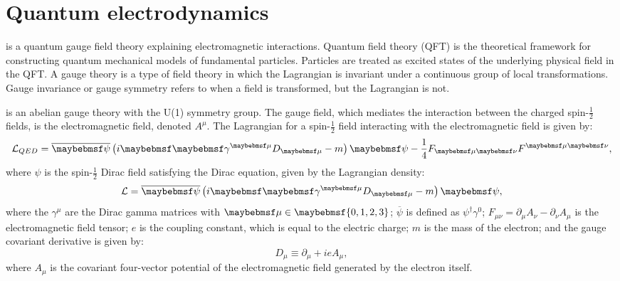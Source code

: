 \section{Quantum electrodynamics}


 \QED is a  quantum gauge field theory explaining electromagnetic interactions. Quantum field theory (QFT) is the theoretical framework for constructing quantum mechanical models of fundamental particles. Particles are treated as excited states of the underlying physical field in the QFT.  A gauge theory is a type of field theory in which the Lagrangian is invariant under a continuous group of local transformations.  Gauge invariance or gauge symmetry refers to when a field is transformed, but the Lagrangian is not.

\QED is an abelian gauge theory with the  U(1) symmetry group. The gauge field, which mediates the interaction between the charged spin-$\frac{1}{2}$ fields, is the electromagnetic field, denoted $A^{\mu}$. The \QED Lagrangian \cite{peskin1995introduction} for a spin-$\frac{1}{2}$ field interacting with the electromagnetic field is given by:
\begin{equation}
\Lagr_{QED} = \overline{\psi} \left( i\Dstroke - m \right)\psi -  \frac{1}{4}F_{\mu\nu}F^{\mu\nu},
\end{equation}
where $\psi$ is the spin-$\frac{1}{2}$ Dirac field satisfying the Dirac equation, given by the Lagrangian density:
\begin{equation}
\Lagr =  \overline{\psi} \left( i\Dstroke - m \right)\psi,
\end{equation}
where the $\gamma^{\mu}$ are the Dirac gamma matrices with $\mu\in\braces{0,1,2,3}$; $\overline{\psi}$ is defined as $\psi^{\dagger}\gamma^0$; $F_{\mu\nu} = \partial_{\mu}A_{\nu} - \partial_{\nu}A_{\mu}$ is the electromagnetic field tensor; $e$ is the coupling constant, which is equal to the electric charge; $m$ is the mass of the electron; and the gauge covariant derivative is given by:
\begin{equation}
D_{\mu} \equiv \partial_{\mu} + ieA_{\mu},
\end{equation}
where $A_{\mu}$ is the covariant four-vector potential of the electromagnetic field generated by the electron itself.


